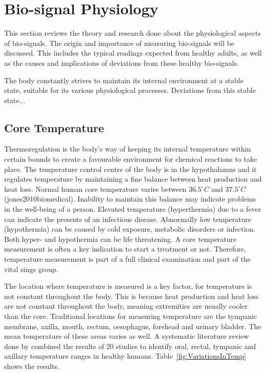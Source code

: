 \section{Bio-signal Physiology}
This section reviews the theory and research done about the physiological aspects of bio-signals. The origin and importance of measuring bio-signals will be discussed. This includes the typical readings expected from healthy adults, as well as the causes and implications of deviations from these healthy bio-signals.

The body constantly strives to maintain its internal environment at a stable state, suitable for its various physiological processes. Deviations from this stable state...

\subsection{Core Temperature}
Thermoregulation is the body's way of keeping its internal temperature within certain bounds to create a favourable environment for chemical reactions to take place. The temperature control centre of the body is in the hypothalamus and it regulates temperature by maintaining a fine balance between heat production and heat loss. Normal human core temperature varies between $36.5^{\circ}C$ and $37.5^{\circ}C$ (jones2010biomedical). Inability to maintain this balance may indicate problems in the well-being of a person. Elevated temperature (hyperthermia) due to a fever can indicate the presents of an infectious disease. Abnormally low temperature (hypothermia) can be caused by cold exposure, metabolic disorders or infection. Both hyper- and hypothermia can be life threatening. A core temperature measurement is often a key indication to start a treatment or not. Therefore, temperature measurement is part of a full clinical examination and part of the vital sings group.

The location where temperature is measured is a key factor, for temperature is not constant throughout the body. This is because heat production and heat loss are not constant throughout the body, meaning extremities are usually cooler than the core. Traditional locations for measuring temperature are the tympanic membrane, axilla, mouth, rectum, oesophagus, forehead and urinary bladder. The mean temperature of these areas varies as well. A systematic literature review done by \cite{sund2002normal} combined the results of 20 studies to identify oral, rectal, tympanic and axillary temperature ranges in healthy humans. Table~\ref{fig:VariationsInTemp} shows the results.

